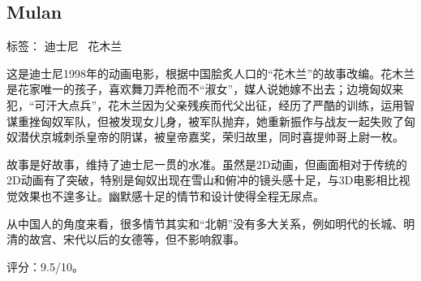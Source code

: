\subsection{Mulan}

标签： 迪士尼 \ 花木兰

这是迪士尼1998年的动画电影，根据中国脍炙人口的“花木兰”的故事改编。花木兰是花家唯一的孩子，喜欢舞刀弄枪而不“淑女”，媒人说她嫁不出去；边境匈奴来犯，“可汗大点兵”，花木兰因为父亲残疾而代父出征，经历了严酷的训练，运用智谋重挫匈奴军队，但被发现女儿身，被军队抛弃，她重新振作与战友一起失败了匈奴潜伏京城刺杀皇帝的阴谋，被皇帝嘉奖，荣归故里，同时喜提帅哥上尉一枚。

故事是好故事，维持了迪士尼一贯的水准。虽然是2D动画，但画面相对于传统的2D动画有了突破，特别是匈奴出现在雪山和俯冲的镜头感十足，与3D电影相比视觉效果也不遑多让。幽默感十足的情节和设计使得全程无尿点。

从中国人的角度来看，很多情节其实和“北朝”没有多大关系，例如明代的长城、明清的故宫、宋代以后的女德等，但不影响叙事。

评分：9.5/10。
